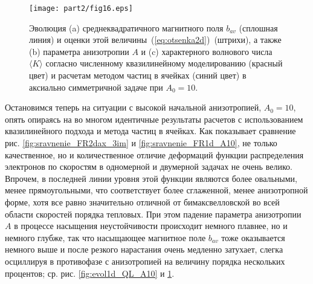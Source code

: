 \begin{figure}[b]
\centering
\texttt{[image: part2/fig16.eps]}
\caption{Эволюция (a) среднеквадратичного магнитного поля $b_{av}$ (сплошная линия) и оценки этой величины~(\ref{eq:otsenka2d})~(штрихи), а также (b) параметра анизотропии $A$ и (c) характерного волнового числа $\langle K\rangle$ согласно численному квазилинейному моделированию (красный цвет) и расчетам методом частиц в ячейках (синий цвет) в аксиально симметричной задаче при $A_0=10$.}
\label{fig:evol2d}
\end{figure}
Остановимся теперь на ситуации с высокой начальной анизотропией, $A_0=10$, опять опираясь на во многом идентичные результаты расчетов с использованием квазилинейного подхода и метода частиц в ячейках. Как показывает сравнение рис. \ref{fig:sravnenie_FR2dax_3im} и \ref{fig:sravnenie_FR1d_A10}, не только качественное, но и количественное отличие деформаций функции распределения электронов по скоростям в одномерной и двумерной задачах не очень велико. Впрочем, в последней линии уровня этой функции являются более овальными, менее прямоугольными, что соответствует более сглаженной, менее анизотропной форме, хотя все равно значительно отличной от бимаксвелловской во всей области скоростей порядка тепловых. При этом падение параметра анизотропии $A$ в процессе насыщения неустойчивости происходит немного плавнее, но и немного глубже, так что насыщающее магнитное поле $b_{av}$ тоже оказывается немного выше и после резкого нарастания очень медленно затухает, слегка осциллируя в противофазе с анизотропией на величину порядка нескольких процентов; ср. рис. \ref{fig:evol1d_QL_A10} и \ref{fig:evol2d}. 

